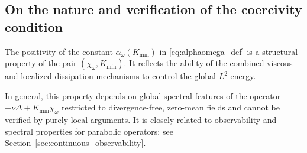 \documentclass[preprint,12pt]{elsarticle}
\begin{document}
%
%
%
%
%

\subsection{On the nature and verification of the coercivity condition}

The positivity of the constant $\alpha_\omega(K_{\min})$ in
\eqref{eq:alphaomega_def} is a structural property of the pair
$(\chi_\omega,K_{\min})$.
It reflects the ability of the combined viscous and localized dissipation
mechanisms to control the global $L^2$ energy.

In general, this property depends on global spectral features of the operator
$-\nu\Delta + K_{\min}\chi_\omega$ restricted to divergence-free, zero-mean
fields and cannot be verified by purely local arguments.
It is closely related to observability and spectral properties for parabolic
operators; see Section~\ref{sec:continuous_observability}.
\end{document}
